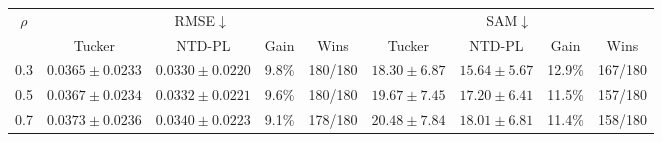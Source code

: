 \begin{tabular}{@{}c c c c c c c c c@{}}
\toprule
\multirow{2}{*}{\(\rho\)} &
\multicolumn{4}{c}{RMSE\(\downarrow\)} &
\multicolumn{4}{c}{SAM\(\downarrow\)} \\
\cmidrule(lr){2-5}\cmidrule(l){6-9}
& Tucker & NTD-PL & Gain & Wins
& Tucker & NTD-PL & Gain & Wins \\
\midrule
0.3 & \(0.0365{\pm}0.0233\) & \(0.0330{\pm}0.0220\) & 9.8\% & 180/180
& \(18.30{\pm}6.87\) & \(15.64{\pm}5.67\) & 12.9\% & 167/180 \\
0.5 & \(0.0367{\pm}0.0234\) & \(0.0332{\pm}0.0221\) & 9.6\% & 180/180
& \(19.67{\pm}7.45\) & \(17.20{\pm}6.41\) & 11.5\% & 157/180 \\
0.7 & \(0.0373{\pm}0.0236\) & \(0.0340{\pm}0.0223\) & 9.1\% & 178/180
& \(20.48{\pm}7.84\) & \(18.01{\pm}6.81\) & 11.4\% & 158/180 \\
\bottomrule
\end{tabular}

